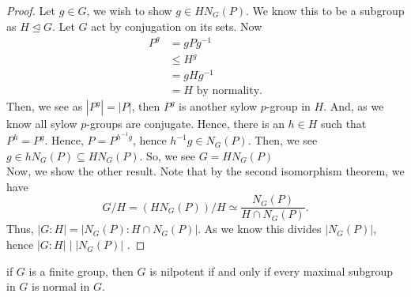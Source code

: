 \begin{proof}
	Let \(g \in G\), we wish to show \(g \in HN_{G}\left( P \right) \). We know this to be a subgroup as \(H \trianglelefteq G\). Let \(G\) act by conjugation on its sets. Now
	\begin{align*}
		P^{g} &= gPg^{-1}\\
		      &\le H^{g}\\
		      &= gHg^{-1} \\
		      &= H \text{ by normality}
	.\end{align*}
	Then, we see as \(\left| P^{g} \right|= \left| P \right|  \), then \(P^{g}\) is another sylow \(p\)-group in \(H\). And, as we know all sylow \(p\)-groups are conjugate. Hence, there is an \(h \in H\) such that \(P^{h} = P^{g}\). Hence, \(P = P^{h^{-1} g}\), hence \(h^{-1} g \in N_{G}\left( P \right) \). Then, we see \(g \in hN_{G}\left( P \right) \subseteq  HN_{G}\left( P \right)  \). So, we see \(G = HN_{G}\left( P \right) \)\\
Now, we show the other result. Note that by the second isomorphism theorem, we have \[
	G / H = \left( HN_{G}\left( P \right)\right) / H \simeq \frac{ N_{G}\left( P \right) }{H \cap N_{G }\left( P \right) }
.\]
Thus, \(\left| G : H \right|  = \left| N_{G}\left( P \right)  : H \cap N_{G}\left( P \right)  \right| \). As we know this divides \(\left| N_{G}\left( P \right)  \right| \), hence \(\left| G  : H\right|  \mid \left| N_{G}\left( P \right)  \right| \) .
\end{proof}
\begin{theorem}
	if \(G\) is a finite group, then \(G\) is nilpotent if and only if every maximal subgroup in \(G\) is normal in \(G\).
\end{theorem}

